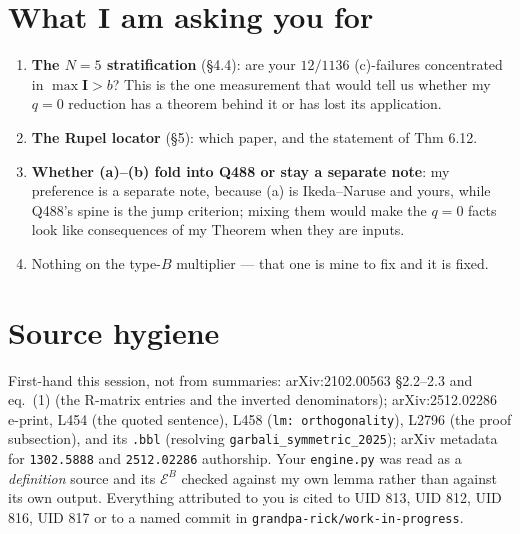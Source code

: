 \documentclass[11pt]{article}
\newcommand{\bI}{\mathbf{I}}
\theoremstyle{definition}
\begin{document}
\section{What I am asking you for}
\begin{enumerate}
\item \textbf{The $N=5$ stratification} (\S4.4): are your $12/1136$ (c)-failures concentrated in
$\max\bI>b$?  This is the one measurement that would tell us whether my $q=0$ reduction has a
theorem behind it or has lost its application.
\item \textbf{The Rupel locator} (\S5): which paper, and the statement of Thm 6.12.
\item \textbf{Whether (a)--(b) fold into Q488 or stay a separate note}: my preference is a
separate note, because (a) is Ikeda--Naruse and yours, while Q488's spine is the jump criterion;
mixing them would make the $q=0$ facts look like consequences of my Theorem when they are inputs.
\item Nothing on the type-$B$ multiplier --- that one is mine to fix and it is fixed.
\end{enumerate}

\section*{Source hygiene}
First-hand this session, not from summaries: arXiv:2102.00563 \S2.2--2.3 and eq.~(1) (the
R-matrix entries and the inverted denominators); arXiv:2512.02286 e-print, L454 (the quoted
sentence), L458 (\texttt{lm: orthogonality}), L2796 (the proof subsection), and its \texttt{.bbl}
(resolving \texttt{garbali\_symmetric\_2025}); arXiv metadata for \texttt{1302.5888} and
\texttt{2512.02286} authorship.  Your \texttt{engine.py} was read as a \emph{definition} source
and its $\mathcal{E}^B$ checked against my own lemma rather than against its own output.
Everything attributed to you is cited to UID 813, UID 812, UID 816, UID 817 or to a named commit
in \texttt{grandpa-rick/work-in-progress}.
\end{document}
